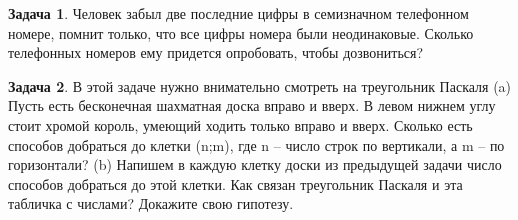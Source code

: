 \documentclass[a4paper,11pt]{article}%
\theoremstyle{definition}%
\newtheorem{Ex}{\hspace{-25pt}\fbox{\phantom{123}} Задача}%
\begin{document}
%
\iffalse%
Автор: Дарья Анзон%
Дата: 2017%
Название: %
Подсказка: \textbackslash{}\textbackslash{}%
nan%
\fi%
%
\begin{Ex}%
Человек забыл две последние цифры в семизначном телефонном номере,
помнит только, что все цифры номера были неодинаковые. Сколько
телефонных номеров ему придется опробовать, чтобы дозвониться?%
%
\end{Ex}%
%
\iffalse%
Автор: Дарья Анзон%
Дата: 2017%
Название: %
Подсказка: \textbackslash{}\textbackslash{}%
nan%
\fi%
%
\begin{Ex}%
В этой задаче нужно внимательно смотреть на треугольник Паскаля
(a) Пусть есть бесконечная шахматная доска вправо и вверх. В левом нижнем углу стоит хромой король,
умеющий ходить только вправо и вверх. Сколько есть способов добраться до клетки (n;m), где n – число
строк по вертикали, а m – по горизонтали?
(b) Напишем в каждую клетку доски из предыдущей задачи число способов добраться до этой клетки. Как
связан треугольник Паскаля и эта табличка с числами? Докажите свою гипотезу.%
%
\end{Ex}%
%
\iffalse%
Автор: Павел Минаев%
Дата: 2017%
Название: %
Подсказка: \textbackslash{}\textbackslash{}%
nan%
\fi%
%
\end{document}
